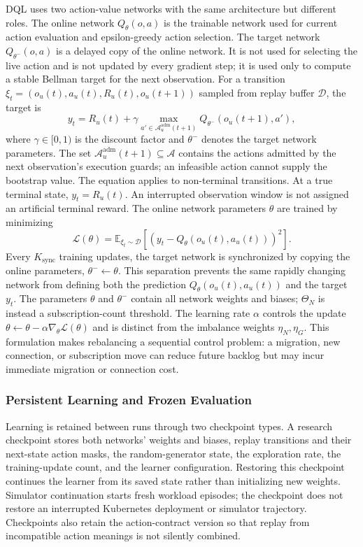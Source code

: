 \documentclass[manuscript,nonacm]{acmart}
\begin{document}
DQL uses two action-value networks with the same architecture but different
roles. The online network $Q_\theta(o,a)$ is the trainable network used for
current action evaluation and epsilon-greedy action selection. The target
network $Q_{\theta^-}(o,a)$ is a delayed copy of the online network. It is not
used for selecting the live action and is not updated by every gradient step;
it is used only to compute a stable Bellman target for the next observation.
For a transition
$\xi_t=(o_u(t),a_u(t),R_u(t),o_u(t+1))$ sampled from replay buffer
$\mathcal{D}$, the target is
\begin{equation}
	y_t =
	R_u(t) + \gamma
	\max_{a'\in\mathcal{A}^{\mathrm{adm}}_u(t+1)}Q_{\theta^-}(o_u(t+1),a'),
	\label{eq:dql_target}
\end{equation}
where $\gamma\in[0,1)$ is the discount factor and $\theta^-$ denotes the target
network parameters. The set $\mathcal{A}^{\mathrm{adm}}_u(t+1)\subseteq\mathcal{A}$
contains the actions admitted by the next observation's execution guards;
an infeasible action cannot supply the bootstrap value. The equation applies
to non-terminal transitions. At a true terminal state, $y_t=R_u(t)$.
An interrupted observation window is not assigned an artificial terminal
reward. The online network parameters $\theta$ are trained by
minimizing
\begin{equation}
	\mathcal{L}(\theta)=
	\mathbb{E}_{\xi_t\sim\mathcal{D}}
	\left[
	\left(y_t-Q_\theta(o_u(t),a_u(t))\right)^2
	\right].
	\label{eq:dql_loss}
\end{equation}
Every $K_{\mathrm{sync}}$ training updates, the target network is synchronized by copying the
online parameters, $\theta^- \leftarrow \theta$. This separation prevents the
same rapidly changing network from defining both the prediction
$Q_\theta(o_u(t),a_u(t))$ and the target $y_t$. The parameters $\theta$ and
$\theta^-$ contain all network weights and biases; $\Theta_N$ is instead a
subscription-count threshold. The learning rate $\alpha$ controls the update
$\theta\leftarrow\theta-\alpha\nabla_\theta\mathcal{L}(\theta)$ and is
distinct from the imbalance weights $\eta_N,\eta_G$.
This formulation makes rebalancing a sequential control problem: a migration,
new connection, or subscription move can reduce future backlog but may incur
immediate migration or connection cost.

\subsubsection{Persistent Learning and Frozen Evaluation}
Learning is retained between runs through two checkpoint types. A research
checkpoint stores both networks' weights and biases, replay transitions and
their next-state action masks, the random-generator state, the exploration
rate, the training-update count, and the learner configuration. Restoring this
checkpoint continues the learner from its saved state rather than initializing
new weights. Simulator continuation starts fresh workload episodes; the
checkpoint does not restore an interrupted Kubernetes deployment or simulator
trajectory. Checkpoints also retain the action-contract version so that replay
from incompatible action meanings is not silently combined.
\end{document}
